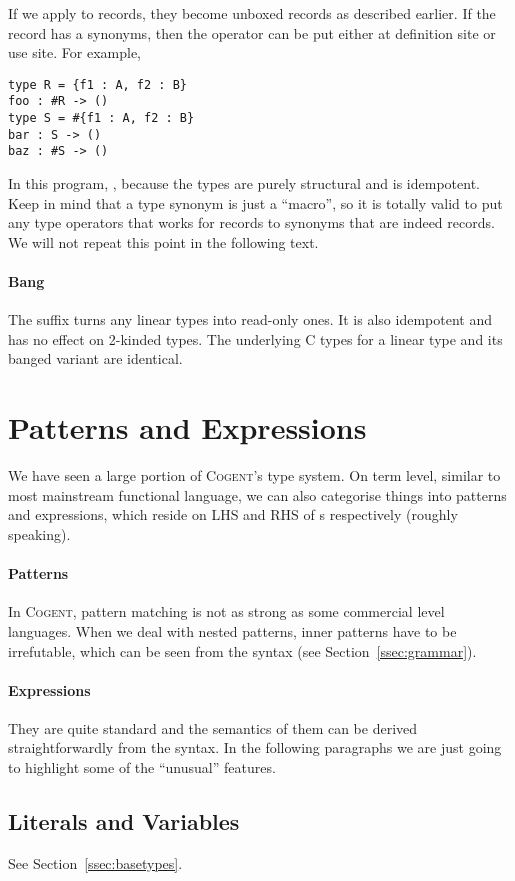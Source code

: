 \documentclass[a4paper]{article}
\newcommand{\cogent}{\textsc{Cogent}\xspace}
\begin{document}
If we apply \code{\#} to records, they become unboxed records as described earlier.
If the record has a synonyms, then the operator can be put either at definition site
or use site. For example,
\begin{lstlisting}[language=Cogent]
type R = {f1 : A, f2 : B}
foo : #R -> ()
type S = #{f1 : A, f2 : B}
bar : S -> ()
baz : #S -> ()
\end{lstlisting}
In this program, , because the types are purely structural and
\code{\#} is idempotent. Keep in mind that a type synonym is just a ``macro'',
so it is totally valid to put any type operators that works for records to
synonyms that are indeed records. We will not repeat this point in the following text.

\paragraph{Bang} The \code{!} suffix turns any linear types into read-only ones.
It is also idempotent and has no effect on 2-kinded types. The underlying C types
for a linear type and its banged variant are identical.

\section{Patterns and Expressions}
We have seen a large portion of \cogent's type system. On term level, similar to most mainstream functional language,
we can also categorise things into patterns and expressions, which reside on LHS and RHS of \code{=}s respectively (roughly speaking).

\paragraph{Patterns} In \cogent, pattern matching is not as strong as some commercial level languages. When we deal with nested patterns,
inner patterns have to be irrefutable, which can be seen from the syntax (see Section~\ref{ssec:grammar}).

\paragraph{Expressions} They are quite standard and the semantics of them can be derived straightforwardly from the syntax. In the following
paragraphs we are just going to highlight some of the ``unusual'' features.

\subsection{Literals and Variables}
See Section~\ref{ssec:basetypes}.
\end{document}
